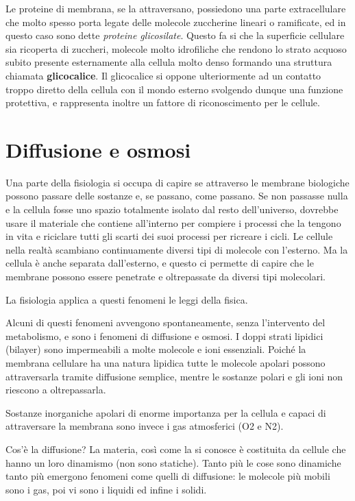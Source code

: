 \documentclass[]{article}
\begin{document}
Le proteine di membrana, se la attraversano, possiedono una parte
extracellulare che molto spesso porta legate delle molecole zuccherine
lineari o ramificate, ed in questo caso sono dette \emph{proteine
glicosilate}. Questo fa si che la superficie cellulare sia ricoperta di
zuccheri, molecole molto idrofiliche che rendono lo strato acquoso
subito presente esternamente alla cellula molto denso formando una
struttura chiamata \textbf{glicocalice}. Il glicocalice si oppone
ulteriormente ad un contatto troppo diretto della cellula con il mondo
esterno svolgendo dunque una funzione protettiva, e rappresenta inoltre
un fattore di riconoscimento per le cellule.

\section{Diffusione e osmosi}\label{diffusione-e-osmosi}

Una parte della fisiologia si occupa di capire se attraverso le membrane
biologiche possono passare delle sostanze e, se passano, come passano.
Se non passasse nulla e la cellula fosse uno spazio totalmente isolato
dal resto dell'universo, dovrebbe usare il materiale che contiene
all'interno per compiere i processi che la tengono in vita e riciclare
tutti gli scarti dei suoi processi per ricreare i cicli. Le cellule
nella realtà scambiano continuamente diversi tipi di molecole con
l'esterno. Ma la cellula è anche separata dall'esterno, e questo ci
permette di capire che le membrane possono essere penetrate e
oltrepassate da diversi tipi molecolari.

La fisiologia applica a questi fenomeni le leggi della fisica.

Alcuni di questi fenomeni avvengono spontaneamente, senza l'intervento
del metabolismo, e sono i fenomeni di diffusione e osmosi. I doppi
strati lipidici (bilayer) sono impermeabili a molte molecole e ioni
essenziali. Poiché la membrana cellulare ha una natura lipidica tutte le
molecole apolari possono attraversarla tramite diffusione semplice,
mentre le sostanze polari e gli ioni non riescono a oltrepassarla.

Sostanze inorganiche apolari di enorme importanza per la cellula e
capaci di attraversare la membrana sono invece i gas atmosferici (O2 e
N2).

Cos'è la diffusione? La materia, così come la si conosce è costituita da
cellule che hanno un loro dinamismo (non sono statiche). Tanto più le
cose sono dinamiche tanto più emergono fenomeni come quelli di
diffusione: le molecole più mobili sono i gas, poi vi sono i liquidi ed
infine i solidi.
\end{document}
